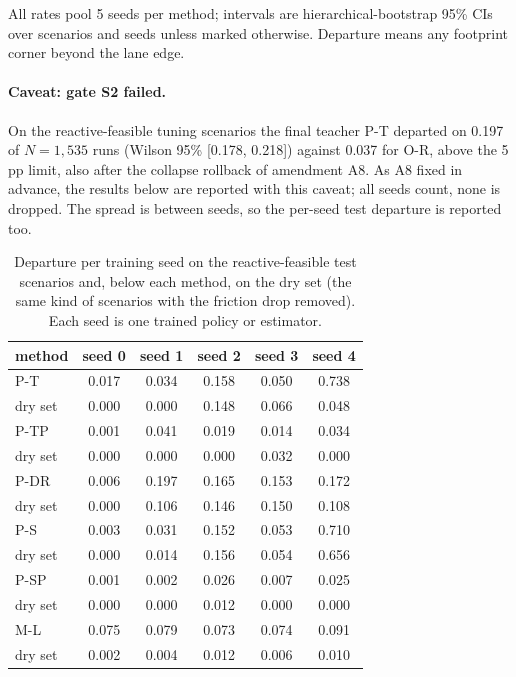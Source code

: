 All rates pool 5 seeds per method; intervals are hierarchical-bootstrap 95\% CIs over scenarios and seeds unless marked otherwise. Departure means any footprint corner beyond the lane edge.

\paragraph{Caveat: gate S2 failed.} On the reactive-feasible tuning scenarios the final teacher P-T departed on 0.197 of $N=1,535$ runs (Wilson 95\% [0.178, 0.218]) against 0.037 for O-R, above the 5\,pp limit, also after the collapse rollback of amendment A8. As A8 fixed in advance, the results below are reported with this caveat; all seeds count, none is dropped. The spread is between seeds, so the per-seed test departure is reported too.
\begin{table}[t]\centering\small\begin{tabular}{@{}lccccc@{}}\toprule method & seed 0 & seed 1 & seed 2 & seed 3 & seed 4\\\midrule
P-T & 0.017 & 0.034 & 0.158 & 0.050 & 0.738\\
\quad dry set & 0.000 & 0.000 & 0.148 & 0.066 & 0.048\\
P-TP & 0.001 & 0.041 & 0.019 & 0.014 & 0.034\\
\quad dry set & 0.000 & 0.000 & 0.000 & 0.032 & 0.000\\
P-DR & 0.006 & 0.197 & 0.165 & 0.153 & 0.172\\
\quad dry set & 0.000 & 0.106 & 0.146 & 0.150 & 0.108\\
P-S & 0.003 & 0.031 & 0.152 & 0.053 & 0.710\\
\quad dry set & 0.000 & 0.014 & 0.156 & 0.054 & 0.656\\
P-SP & 0.001 & 0.002 & 0.026 & 0.007 & 0.025\\
\quad dry set & 0.000 & 0.000 & 0.012 & 0.000 & 0.000\\
M-L & 0.075 & 0.079 & 0.073 & 0.074 & 0.091\\
\quad dry set & 0.002 & 0.004 & 0.012 & 0.006 & 0.010\\
\bottomrule\end{tabular}\caption{Departure per training seed on the reactive-feasible test scenarios and, below each method, on the dry set (the same kind of scenarios with the friction drop removed). Each seed is one trained policy or estimator.}\label{tab:seeds}\end{table}

